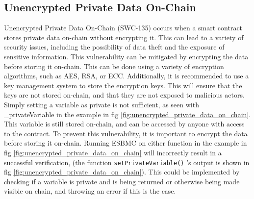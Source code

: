 \subsection{Unencrypted Private Data On-Chain}
\label{sec:unencrypted_private_data_on_chain}

Unencrypted Private Data On-Chain (SWC-135) occurs when a smart contract stores private data on-chain without encrypting it. This can lead to a variety of security issues, including the possibility of data theft and the exposure of sensitive information. This vulnerability can be mitigated by encrypting the data before storing it on-chain. This can be done using a variety of encryption algorithms, such as AES, RSA, or ECC. Additionally, it is recommended to use a key management system to store the encryption keys. This will ensure that the keys are not stored on-chain, and that they are not exposed to malicious actors. Simply setting a variable as private is not sufficient, as seen with \_privateVariable in the example in fig \ref{fig:unencrypted_private_data_on_chain}. This variable is still stored on-chain, and can be accessed by anyone with access to the contract. To prevent this vulnerability, it is important to encrypt the data before storing it on-chain. Running ESBMC on either function in the example in fig \ref{fig:unencrypted_private_data_on_chain} will incorrectly result in a successful verification, (the function \verb|setPrivateVariable()| 's output is shown in fig \ref{fig:unencrypted_private_data_on_chain}). This could be implemented by checking if a variable is private and is being returned or otherwise being made visible on chain, and throwing an error if this is the case.


